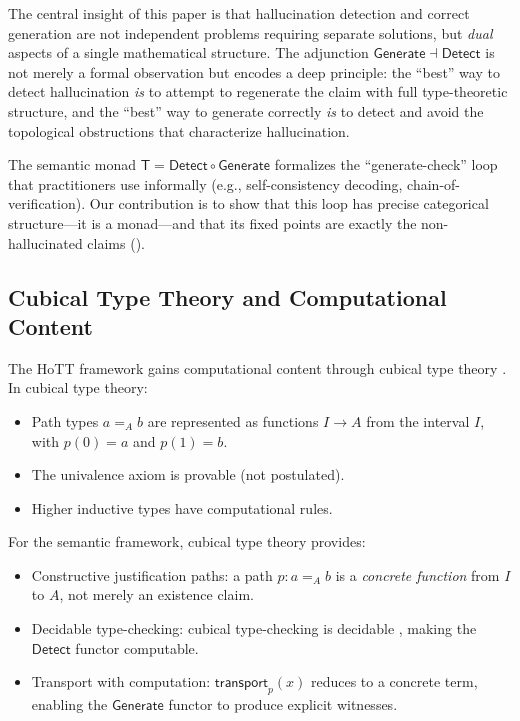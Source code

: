 \documentclass[11pt,a4paper]{article}
\theoremstyle{plain}
\theoremstyle{definition}
\theoremstyle{remark}
\newcommand{\transport}{\mathsf{transport}}
\newcommand{\Detect}{\mathsf{Detect}}
\newcommand{\Generate}{\mathsf{Generate}}
\newcommand{\SemanticT}{\mathsf{T}}
\begin{document}
The central insight of this paper is that hallucination detection and correct generation are not independent problems requiring separate solutions, but \emph{dual} aspects of a single mathematical structure. The adjunction $\Generate \dashv \Detect$ is not merely a formal observation but encodes a deep principle: the ``best'' way to detect hallucination \emph{is} to attempt to regenerate the claim with full type-theoretic structure, and the ``best'' way to generate correctly \emph{is} to detect and avoid the topological obstructions that characterize hallucination.

The semantic monad $\SemanticT = \Detect \circ \Generate$ formalizes the ``generate-check'' loop that practitioners use informally (e.g., self-consistency decoding, chain-of-verification). Our contribution is to show that this loop has precise categorical structure---it is a monad---and that its fixed points are exactly the non-hallucinated claims ().

\subsection{Cubical Type Theory and Computational Content}

The HoTT framework gains computational content through cubical type theory \cite{cohen2018cubical}. In cubical type theory:
\begin{itemize}[nosep]
  \item Path types $a =_A b$ are represented as functions $I \to A$ from the interval $I$, with $p(0) = a$ and $p(1) = b$.
  \item The univalence axiom is provable (not postulated).
  \item Higher inductive types have computational rules.
\end{itemize}

For the semantic framework, cubical type theory provides:
\begin{itemize}[nosep]
  \item Constructive justification paths: a path $p\colon a =_A b$ is a \emph{concrete function} from $I$ to $A$, not merely an existence claim.
  \item Decidable type-checking: cubical type-checking is decidable \cite{angiuli2018cartesian}, making the $\Detect$ functor computable.
  \item Transport with computation: $\transport_p(x)$ reduces to a concrete term, enabling the $\Generate$ functor to produce explicit witnesses.
\end{itemize}
\end{document}
